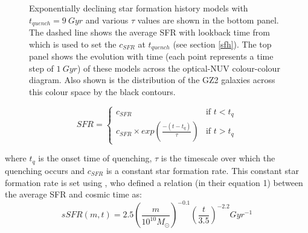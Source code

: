 \documentclass{mn2e}
\begin{document}
\begin{figure}
\caption{Exponentially declining star formation history models with $t_{quench}=9~Gyr$ and various $\tau$ values are shown in the bottom panel. The dashed line shows the average SFR with lookback time from \cite{Peng} which is used to set the $c_{SFR}$ at $t_{quench}$ (see section \ref{sfh}). The top panel shows the evolution with time (each point represents a time step of $1 ~Gyr$) of these models across the optical-NUV colour-colour diagram. Also shown is the distribution of the GZ2 galaxies across this colour space by the black contours.}
\label{kev}
\end{figure}


\[
SFR = 
\begin{cases}
c_{SFR} & \text{if } t < t_{q} \\
c_{SFR} \times exp{\left( \frac{-(t-t_{q})}{\tau}\right)} & \text{if } t > t_{q}
\end{cases}
\]

where $t_{q}$ is the onset time of quenching, $\tau$ is the timescale over which the quenching occurs and $c_{SFR}$ is a constant star formation rate. This constant star formation rate is set using \citet{Peng}, who defined a relation (in their equation 1) between the average SFR and cosmic time as:
\begin{equation*}
sSFR(m,t) = 2.5 \left( \frac{m}{10^{10} M_{\odot}} \right)^{-0.1} \left(\frac{t}{3.5}\right)^{-2.2} Gyr^{-1}
\end{equation*}
\end{document}
